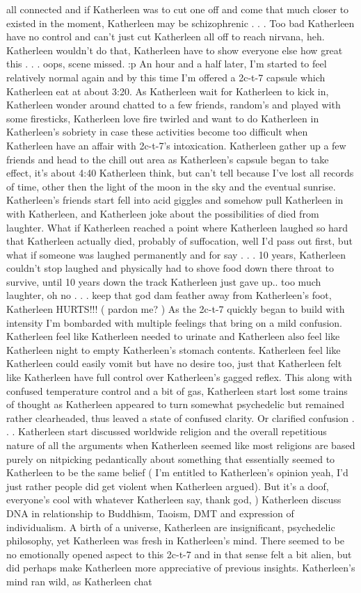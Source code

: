 \documentclass[12pt]{book}
\begin{document}
all connected and if Katherleen was to cut one off and come that much closer to existed in the moment, Katherleen may be schizophrenic . . .  Too bad Katherleen have no control and can't just cut Katherleen all off to reach nirvana, heh. Katherleen wouldn't do that, Katherleen have to show everyone else how great this . . .  oops, scene missed. :p An hour and a half later, I'm started to feel relatively normal again and by this time I'm offered a 2c-t-7 capsule which Katherleen eat at about 3:20. As Katherleen wait for Katherleen to kick in, Katherleen wonder around chatted to a few friends, random's and played with some firesticks, Katherleen love fire twirled and want to do Katherleen in Katherleen's sobriety in case these activities become too difficult when Katherleen have an affair with 2c-t-7's intoxication. Katherleen gather up a few friends and head to the chill out area as Katherleen's capsule began to take effect, it's about 4:40 Katherleen think, but can't tell because I've lost all records of time, other then the light of the moon in the sky and the eventual sunrise. Katherleen's friends start fell into acid giggles and somehow pull Katherleen in with Katherleen, and Katherleen joke about the possibilities of died from laughter. What if Katherleen reached a point where Katherleen laughed so hard that Katherleen actually died, probably of suffocation, well I'd pass out first, but what if someone was laughed permanently and for say . . .  10 years, Katherleen couldn't stop laughed and physically had to shove food down there throat to survive, until 10 years down the track Katherleen just gave up.. too much laughter, oh no . . .  keep that god dam feather away from Katherleen's foot, Katherleen HURTS!!! ( pardon me? ) As the 2c-t-7 quickly began to build with intensity I'm bombarded with multiple feelings that bring on a mild confusion. Katherleen feel like Katherleen needed to urinate and Katherleen also feel like Katherleen night to empty Katherleen's stomach contents. Katherleen feel like Katherleen could easily vomit but have no desire too, just that Katherleen felt like Katherleen have full control over Katherleen's gagged reflex. This along with confused temperature control and a bit of gas, Katherleen start lost some trains of thought as Katherleen appeared to turn somewhat psychedelic but remained rather clearheaded, thus leaved a state of confused clarity. Or clarified confusion . . .  Katherleen start discussed worldwide religion and the overall repetitious nature of all the arguments when Katherleen seemed like most religions are based purely on nitpicking pedantically about something that essentially seemed to Katherleen to be the same belief ( I'm entitled to Katherleen's opinion yeah, I'd just rather people did get violent when Katherleen argued). But it's a doof, everyone's cool with whatever Katherleen say, thank god, ) Katherleen discuss DNA in relationship to Buddhism, Taoism, DMT and expression of individualism. A birth of a universe, Katherleen are insignificant, psychedelic philosophy, yet Katherleen was fresh in Katherleen's mind. There seemed to be no emotionally opened aspect to this 2c-t-7 and in that sense felt a bit alien, but did perhaps make Katherleen more appreciative of previous insights. Katherleen's mind ran wild, as Katherleen chat 
\end{document}
